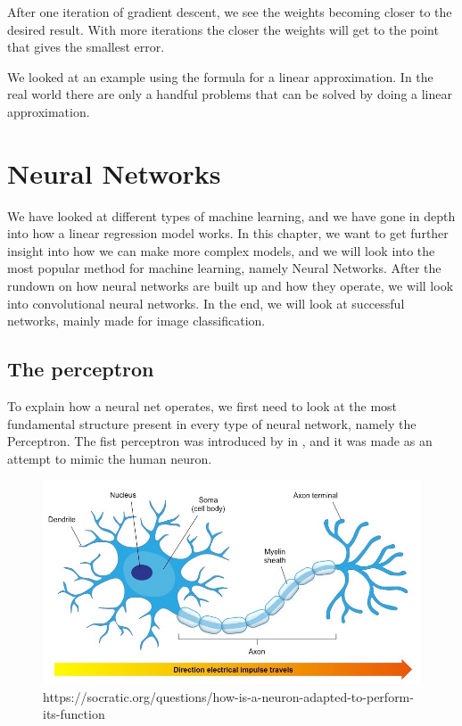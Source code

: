 After one iteration of gradient descent, we see the weights becoming closer to the desired result. With more iterations the closer the weights will get to the point that gives the smallest error. 

 
We looked at an example using the formula for a linear approximation. In the real world there are only a handful problems that can be solved by doing a linear approximation.

    

   
      

    
\section{Neural Networks}
We have looked at different types of machine learning, and we have gone in depth into how a linear regression model works. In this chapter, we want to get further insight into how we can make more complex models, and we will look into the most popular method for machine learning, namely Neural Networks. 
After the rundown on how neural networks are built up and how they operate, we will look into convolutional neural networks. In the end, we will look at successful networks, mainly made for image classification.


\subsection{The perceptron}
\label{chap:perceptron}
To explain how a neural net operates, we first need to look at the most fundamental structure present in every type of neural network, namely the Perceptron.
The fist perceptron was introduced by  in , and it was made as an attempt to mimic the human neuron.  


\begin{figure}[h]
        \centering
        \includegraphics[scale=0.5]{background/figures/neuron.jpg}
        \caption{https://socratic.org/questions/how-is-a-neuron-adapted-to-perform-its-function}
        \label{fig:neuron}
\end{figure}


